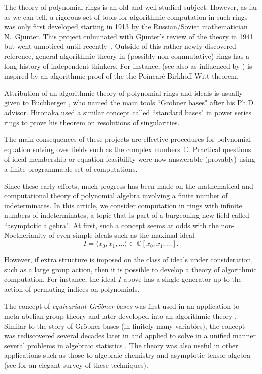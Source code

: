 The theory of polynomial rings is an old and well-studied subject.  However, as far as we can tell, a rigorous set of tools for algorithmic computation in such rings was only first developed starting in 1913 \cite{gjunter1913} by the Russian/Soviet mathematician N.~Gjunter.  This project culminated with Gjunter's review of the theory in 1941 \cite{gunther1941modules} but went unnoticed until recently~\cite{renschuch2003contributions}.  Outside of this rather newly discovered reference, general algorithmic theory in (possibly non-commutative) rings has a long history of independent thinkers.  For instance, \cite{bergman1978diamond} (see also \cite{bokut1976embeddings} as influenced by \cite{shirshov1962some}) is inspired by an algorithmic proof of the the Poincar\'e-Birkhoff-Witt theorem.  

Attribution of an algorithmic theory of polynomial rings and ideals is usually given to Buchberger \cite{buchberger1965algorithmus}, who named the main tools ``Gr\"obner bases" after his Ph.D. advisor. Hironaka \cite{hironaka1964resolution} used a similar concept called ``standard bases" in power series rings to prove his theorem on resolutions of singularities.  

The main consequences of these projects are effective procedures for polynomial equation solving over fields such as the complex numbers~$\mathbb{C}$.  Practical questions of ideal membership or equation feasibility were now answerable (provably) using a finite programmable set of computations.  

Since these early efforts, much progress has been made on the mathematical and computational theory of polynomial algebra involving a finite number of indeterminates.  In this article, we consider computation in rings with infinite numbers of indeterminates, a topic that is part of a burgeoning new field called ``asymptotic algebra".  At first, such a concept seems at odds with the non-Noetherianity of even simple ideals such as the maximal ideal \[I = \langle x_0, x_1, \ldots  \rangle \subset \mathbb C[x_0, x_1,\ldots].\]

However, if extra structure is imposed on the class of ideals under consideration, such as a large group action, then it is possible to develop a theory of algorithmic computation.  For instance, the ideal $I$ above has a single generator up to the action of permuting indices on polynomials.

The concept of \emph{equivariant Gr\"obner bases} was first used in an application to meta-abelian group theory \cite{cohen1967laws} and later developed into an algorithmic theory \cite{Emmott, Cohen87}. Similar to the story of Gr\"obner bases (in finitely many variables), the concept was rediscovered several decades later in \cite{aschenbrenner2007finite, aschenbrenner2008algorithm} and applied to solve in a unified manner several problems in algebraic statistics \cite{hillar2012finite}.  The theory was also useful in other applications such as those to algebraic chemistry \cite{Draisma08b} and asymptotic tensor algebra \cite{draisma2014bounded} (see \cite{draisma2014noetherianity} for an elegant survey of these techniques).

